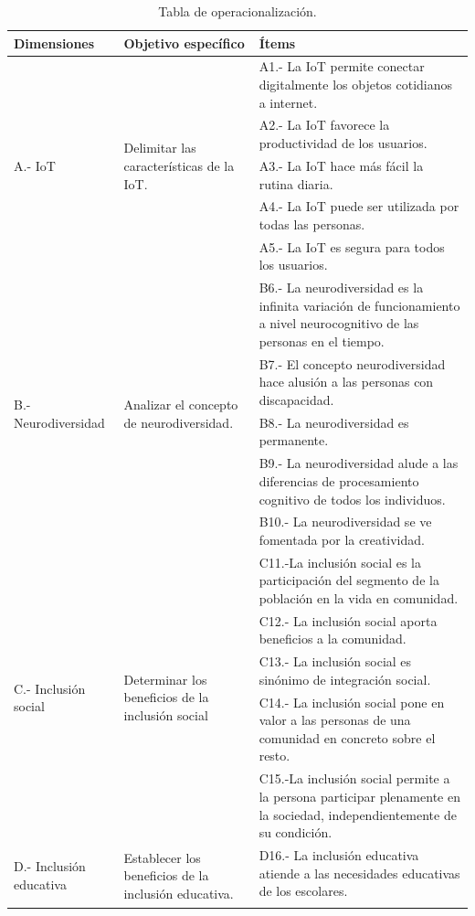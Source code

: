 \documentclass[spanish]{textolivre}
\begin{document}
\begin{table}[h!]
\centering
\caption{Tabla de operacionalización.} \label{Tabla01}
\begin{tabular}{p{}p{}p{}}
Dimensiones & Objetivo específico & Ítems \\
\midrule
\multirow{5}{*}{A.- IoT} & 
\multirow{5}{=}{Delimitar las características de la IoT.} &
A1.- La IoT permite conectar digitalmente los objetos cotidianos a internet. \\ &
& A2.- La IoT favorece la productividad de los usuarios. \\ &
& A3.- La IoT hace más fácil la rutina diaria.\\ &
& A4.- La IoT puede ser utilizada por todas las personas. \\ &
& A5.- La IoT es segura para todos los usuarios.\\
\hline
\multirow{5}{*}{B.- Neurodiversidad} & 
\multirow{5}{=}{Analizar el concepto de neurodiversidad.} &
B6.- La neurodiversidad es la infinita variación de funcionamiento a nivel neurocognitivo de las personas en el tiempo. \\ &
& B7.- El concepto neurodiversidad hace alusión a las personas con discapacidad. \\ &
& B8.- La neurodiversidad es permanente. \\ &
& B9.- La neurodiversidad alude a las diferencias de procesamiento cognitivo de todos los individuos. \\ &
& B10.- La neurodiversidad se ve fomentada por la creatividad. \\
\hline
\multirow{5}{*}{C.- Inclusión social} &
\multirow{5}{=}{Determinar los beneficios de la inclusión social} &
C11.-La inclusión social es la participación del segmento de la población en la vida en comunidad.\\ &
& C12.- La inclusión social aporta beneficios a la comunidad.\\ & 
& C13.- La inclusión social es sinónimo de integración social.\\ & 
& C14.- La inclusión social pone en valor a las personas de una comunidad en concreto sobre el resto.\\ & 
& C15.-La inclusión social permite a la persona participar plenamente en la sociedad, independientemente de su condición.\\
\hline
\multirow{5}{=}{D.- Inclusión educativa} & 
\multirow{5}{=}{Establecer los beneficios de la inclusión educativa.} &
D16.- La inclusión educativa atiende a las necesidades educativas de los escolares. \\ &

\end{tabular}
\end{table}
\end{document}
